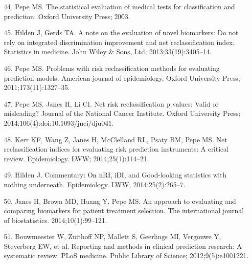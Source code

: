 \documentclass[11pt]{article}
\begin{document}
44. Pepe MS. The statistical evaluation of medical tests for
classification and prediction. Oxford University Press; 2003.

45. Hilden J, Gerds TA. A note on the evaluation of novel biomarkers: Do
not rely on integrated discrimination improvement and net
reclassification index. Statistics in medicine. John Wiley \& Sons, Ltd;
2013;33(19):3405--14.

46. Pepe MS. Problems with risk reclassification methods for evaluating
prediction models. American journal of epidemiology. Oxford University
Press; 2011;173(11):1327--35.

47. Pepe MS, Janes H, Li CI. Net risk reclassification p values: Valid
or misleading? Journal of the National Cancer Institute. Oxford
University Press; 2014;106(4):doi:10.1093/jnci/dju041.

48. Kerr KF, Wang Z, Janes H, McClelland RL, Psaty BM, Pepe MS. Net
reclassification indices for evaluating risk prediction instruments: A
critical review. Epidemiology. LWW; 2014;25(1):114--21.

49. Hilden J. Commentary: On nRI, iDI, and Good-looking statistics
with nothing underneath. Epidemiology. LWW; 2014;25(2):265--7.

50. Janes H, Brown MD, Huang Y, Pepe MS. An approach to evaluating and
comparing biomarkers for patient treatment selection. The international
journal of biostatistics. 2014;10(1):99--121.

51. Bouwmeester W, Zuithoff NP, Mallett S, Geerlings MI, Vergouwe Y,
Steyerberg EW, et al. Reporting and methods in clinical prediction
research: A systematic review. PLoS medicine. Public Library of Science;
2012;9(5):e1001221.
\end{document}
